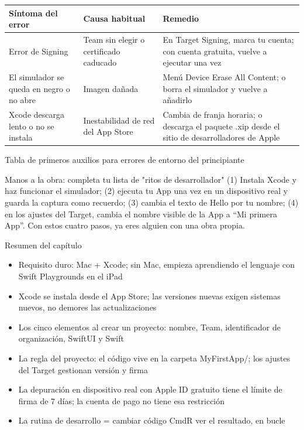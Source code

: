 \begin{center}
\begin{tabularx}{\linewidth}{|X|X|X|}
\hline
\textbf{Síntoma del error} & \textbf{Causa habitual} & \textbf{Remedio} \tabularnewline
\hline
Error de Signing & Team sin elegir o certificado caducado & En Target Signing, marca tu cuenta; con cuenta gratuita, vuelve a ejecutar una vez \tabularnewline
El simulador se queda en negro o no abre & Imagen dañada & Menú Device Erase All Content; o borra el simulador y vuelve a añadirlo \tabularnewline
Xcode descarga lento o no se instala & Inestabilidad de red del App Store & Cambia de franja horaria; o descarga el paquete .xip desde el sitio de desarrolladores de Apple \tabularnewline
\hline
\end{tabularx}
\end{center}

\begin{center}\small\color{gray}Tabla de primeros auxilios para errores de entorno del principiante\end{center}

\begin{tcbpractice}{Manos a la obra: completa tu lista de "ritos de desarrollador"}
(1) Instala Xcode y haz funcionar el simulador; (2) ejecuta tu App una vez en un dispositivo real y guarda la captura como recuerdo; (3) cambia el texto de Hello por tu nombre; (4) en los ajustes del Target, cambia el nombre visible de la App a “Mi primera App”. Con estos cuatro pasos, ya eres alguien con una obra propia.

\end{tcbpractice}

\begin{tcbsummary}{Resumen del capítulo}
\begin{itemize}
  \item Requisito duro: Mac + Xcode; sin Mac, empieza aprendiendo el lenguaje con Swift Playgrounds en el iPad
  \item Xcode se instala desde el App Store; las versiones nuevas exigen sistemas nuevos, no demores las actualizaciones
  \item Los cinco elementos al crear un proyecto: nombre, Team, identificador de organización, SwiftUI y Swift
  \item La regla del proyecto: el código vive en la carpeta MyFirstApp/; los ajustes del Target gestionan versión y firma
  \item La depuración en dispositivo real con Apple ID gratuito tiene el límite de firma de 7 días; la cuenta de pago no tiene esa restricción
  \item La rutina de desarrollo = cambiar código CmdR ver el resultado, en bucle
\end{itemize}

\end{tcbsummary}
